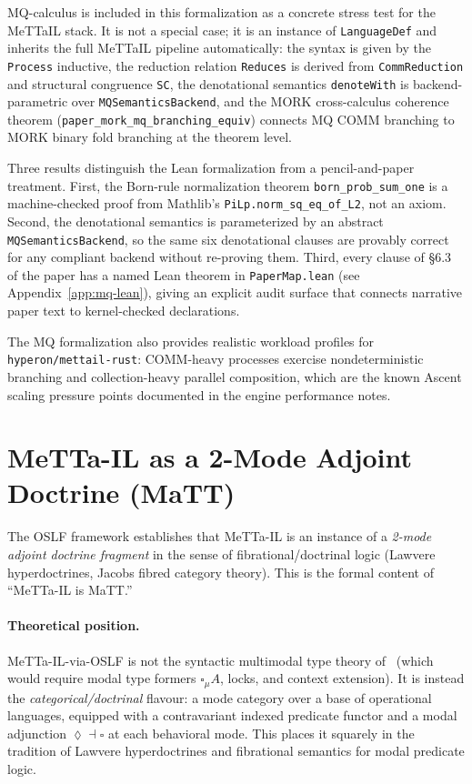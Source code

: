 \documentclass[11pt]{article}
\newcommand{\code}[1]{\texttt{#1}}
\begin{document}
MQ-calculus is included in this formalization as a concrete stress test for the
MeTTaIL stack.  It is not a special case; it is an instance of \code{LanguageDef}
and inherits the full MeTTaIL pipeline automatically: the syntax is given by the
\code{Process} inductive, the reduction relation \code{Reduces} is derived from
\code{CommReduction} and structural congruence \code{SC}, the denotational
semantics \code{denoteWith} is backend-parametric over \code{MQSemanticsBackend},
and the MORK cross-calculus coherence theorem
(\code{paper\_mork\_mq\_branching\_equiv}) connects MQ COMM branching to MORK
binary fold branching at the theorem level.

Three results distinguish the Lean formalization from a pencil-and-paper treatment.
First, the Born-rule normalization theorem \code{born\_prob\_sum\_one} is a
machine-checked proof from Mathlib's \code{PiLp.norm\_sq\_eq\_of\_L2}, not an
axiom.  Second, the denotational semantics is parameterized by an abstract
\code{MQSemanticsBackend}, so the same six denotational clauses are provably correct
for any compliant backend without re-proving them.  Third, every clause of
\S{}6.3 of the paper has a named Lean theorem in \code{PaperMap.lean} (see
Appendix~\ref{app:mq-lean}), giving an explicit audit surface that connects
narrative paper text to kernel-checked declarations.

The MQ formalization also provides realistic workload profiles for
\code{hyperon/mettail-rust}: COMM-heavy processes exercise nondeterministic
branching and collection-heavy parallel composition, which are the known Ascent
scaling pressure points documented in the engine performance notes.

\section{MeTTa-IL as a 2-Mode Adjoint Doctrine (MaTT)}
\label{sec:matt}

The OSLF framework establishes that MeTTa-IL is an instance of a
\emph{2-mode adjoint doctrine fragment} in the sense of
fibrational/doctrinal logic (Lawvere hyperdoctrines, Jacobs fibred
category theory).  This is the formal content of ``MeTTa-IL is MaTT.''

\paragraph{Theoretical position.}
MeTTa-IL-via-OSLF is not the syntactic multimodal type theory
of~\cite{gratzer2020multimodal} (which would require modal type formers
$\square_\mu A$, locks, and context extension).  It is instead the
\emph{categorical/doctrinal} flavour: a mode category over a base of
operational languages, equipped with a contravariant indexed predicate
functor and a modal adjunction $\lozenge \dashv \square$ at each
behavioral mode.  This places it squarely in the tradition of Lawvere
hyperdoctrines and fibrational semantics for modal predicate logic.
\end{document}
